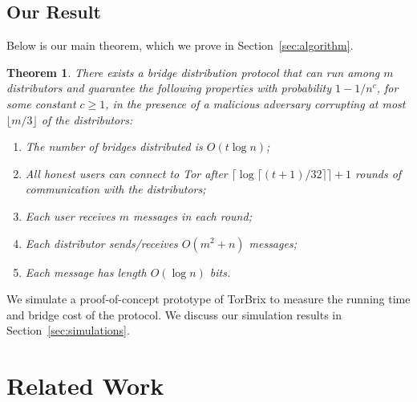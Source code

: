 \documentclass[letterpaper,twocolumn,10pt]{article}
\newcommand{\todo}[1]{{\leavevmode\color{blue}[TODO: #1]}}
\newtheorem{theorem}{Theorem}
\newcommand{\sfsize}{\fontsize{0.73\baselineskip}{0.73\baselineskip}\selectfont}
\newcommand{\sans}[1]{\textsf{\sfsize \mbox{#1}}}
\newcommand{\brix}{\sans{TorBrix}\xspace}
\begin{document}
\subsection{Our Result} \label{sec:results}
\noindent Below is our main theorem, which we prove in Section~\ref{sec:algorithm}.
\begin{theorem}
	\label{thm:main} There exists a bridge distribution protocol that can run among $m$ distributors and guarantee the following properties with probability ${1 - 1/n^c}$, for some constant ${c \geq 1}$, in the presence of a malicious adversary corrupting at most $\lfloor m/3 \rfloor$ of the distributors: %
	\begin{enumerate}[itemsep=-0.25em,topsep=0.5em]
		\item The number of bridges distributed is $O(t\log{n})$;
		\item All honest users can connect to Tor after ${\lceil \log{\lceil (t+1)/32 \rceil} \rceil + 1}$ rounds of communication with the distributors;
		\item Each user receives $m$ messages in each round;
		\item Each distributor sends/receives $O(m^2 + n)$ messages;
		\item Each message has length $O(\log{n})$ bits.
	\end{enumerate}
\end{theorem}

We simulate a proof-of-concept prototype of \brix to measure the running time and bridge cost of the protocol. We discuss our simulation results in Section~\ref{sec:simulations}.



\section{Related Work} \label{sec:relatedwork}
\end{document}
